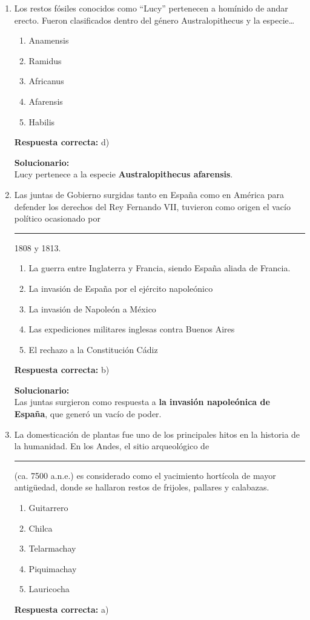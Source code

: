 \begin{enumerate}

	
	\item Los restos fósiles conocidos como “Lucy” pertenecen a homínido de andar erecto. Fueron clasificados dentro del género Australopithecus y la especie…
	\begin{enumerate}[label=\alph*)]
		\item Anamensis
		\item Ramidus
		\item Africanus
		\item Afarensis
		\item Habilis
	\end{enumerate}
	\textbf{Respuesta correcta:} d)
	
	\vspace{2mm}
	\textbf{Solucionario:}\\
	Lucy pertenece a la especie \textbf{Australopithecus afarensis}.
	
	\vspace{6mm}
	
	\item Las juntas de Gobierno surgidas tanto en España como en América para defender los derechos del Rey Fernando VII, tuvieron como origen el vacío político ocasionado por \rule{3cm}{0.4pt} 1808 y 1813.
	\begin{enumerate}[label=\alph*)]
		\item La guerra entre Inglaterra y Francia, siendo España aliada de Francia.
		\item La invasión de España por el ejército napoleónico
		\item La invasión de Napoleón a México
		\item Las expediciones militares inglesas contra Buenos Aires
		\item El rechazo a la Constitución Cádiz
	\end{enumerate}
	\textbf{Respuesta correcta:} b)
	
	\vspace{2mm}
	\textbf{Solucionario:}\\
	Las juntas surgieron como respuesta a \textbf{la invasión napoleónica de España}, que generó un vacío de poder.
	
	\vspace{6mm}
	
	\item La domesticación de plantas fue uno de los principales hitos en la historia de la humanidad. En los Andes, el sitio arqueológico de \rule{3cm}{0.4pt} (ca. 7500 a.n.e.) es considerado como el yacimiento hortícola de mayor antigüedad, donde se hallaron restos de frijoles, pallares y calabazas.
	\begin{enumerate}[label=\alph*)]
		\item Guitarrero
		\item Chilca
		\item Telarmachay
		\item Piquimachay
		\item Lauricocha
	\end{enumerate}
	\textbf{Respuesta correcta:} a)
	

\end{enumerate}
